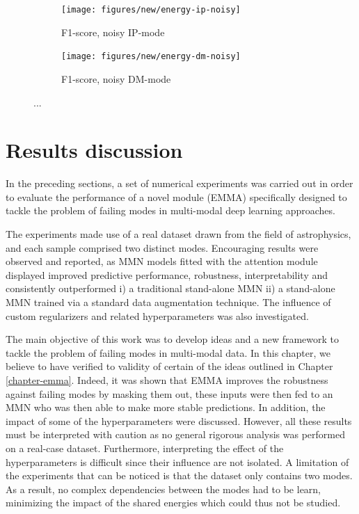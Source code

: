 \begin{figure}[!h]
\centering
\begin{subfigure}{.5\textwidth}
  \centering
  \texttt{[image: figures/new/energy-ip-noisy]}
  \caption{F1-score, noisy IP-mode}
\end{subfigure}%
\begin{subfigure}{.5\textwidth}
  \centering
  \texttt{[image: figures/new/energy-dm-noisy]}
  \caption{F1-score, noisy DM-mode}
\end{subfigure}
\caption[Influence of energy regularization]{...}
\label{fig:exp-att-shift-8}
\end{figure}


\section{Results discussion}
In the preceding sections, a set of numerical experiments was carried out in order to evaluate the performance of a novel module (EMMA) specifically designed to tackle the problem of failing modes in multi-modal deep learning approaches.

The experiments made use of a real dataset drawn from the field of astrophysics, and each sample comprised two distinct modes. Encouraging results were observed and reported, as MMN models fitted with the attention module displayed improved predictive performance, robustness, interpretability and consistently outperformed i) a traditional stand-alone MMN ii) a stand-alone MMN trained via a standard data augmentation technique. The influence of custom regularizers and related hyperparameters was also investigated.

The main objective of this work was to develop ideas and a new framework to tackle the problem of failing modes in multi-modal data. In this chapter, we believe to have verified to validity of certain of the ideas outlined in Chapter \ref{chapter-emma}. Indeed, it was shown that EMMA improves the robustness against failing modes by masking them out, these inputs were then fed to an MMN who was then able to make more stable predictions. In addition, the impact of some of the hyperparameters were discussed. However, all these results must be interpreted with caution as no general rigorous analysis was performed on a real-case dataset. Furthermore, interpreting the effect of the hyperparameters is difficult since their influence are not isolated. A limitation of the experiments that can be noticed is that the dataset only contains two modes. As a result, no complex dependencies between the modes had to be learn, minimizing the impact of the shared energies which could thus not be studied. 


